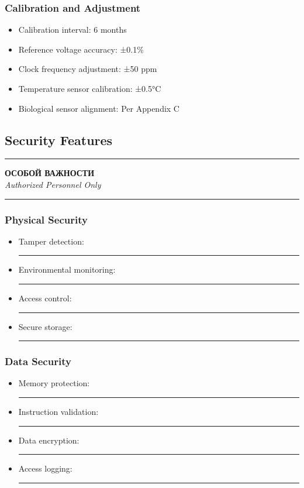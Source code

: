 \documentclass[12pt]{article}
\begin{document}
\subsubsection{Calibration and Adjustment}
\begin{itemize}
    \item Calibration interval: 6 months
    \item Reference voltage accuracy: ±0.1\%
    \item Clock frequency adjustment: ±50 ppm
    \item Temperature sensor calibration: ±0.5°C
    \item Biological sensor alignment: Per Appendix C
\end{itemize}

\subsection{Security Features}
\begin{center}
\textcolor{sovietred}{\rule{0.8\textwidth}{0.4pt}}

\textbf{\foreignlanguage{russian}{ОСОБОЙ ВАЖНОСТИ}}\\
\textit{Authorized Personnel Only}

\rule{0.8\textwidth}{0.4pt}
\end{center}

\subsubsection{Physical Security}
\begin{itemize}
    \item Tamper detection: \rule{65mm}{3.5mm}
    \item Environmental monitoring: \rule{55mm}{3.5mm}
    \item Access control: \rule{45mm}{3.5mm}
    \item Secure storage: \rule{50mm}{3.5mm}
\end{itemize}

\subsubsection{Data Security}
\begin{itemize}
    \item Memory protection: \rule{65mm}{3.5mm}
    \item Instruction validation: \rule{55mm}{3.5mm}
    \item Data encryption: \rule{45mm}{3.5mm}
    \item Access logging: \rule{50mm}{3.5mm}
\end{itemize}
\end{document}
